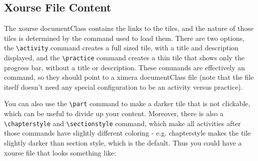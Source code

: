 \documentclass{ximera}
\begin{document}
\subsection*{Xourse File Content}
    The xourse documentClass contains the links to the tiles, and the nature of those tiles is determined by the command used to load them. There are two options, the \verb|\activity| command creates a full sized tile, with a title and description displayed, and the \verb|\practice| command creates a thin tile that shows only the progress bar, without a title or description. These commands are effectively an \verb|| command, so they should point to a ximera documentClass file (note that the file itself doesn't need any special configuration to be an activity versus practice).
    
    You can also use the \verb|\part| command to make a darker tile that is not clickable, which can be useful to divide up your content. Moreover, there is also a \verb|\chapterstyle| and \verb|\sectionstyle| command, which make all activities after those commands have slightly different coloring - e.g. chapterstyle makes the tile slightly darker than section style, which is the default. Thus you could have a xourse file that looks something like:
    
\end{document}
